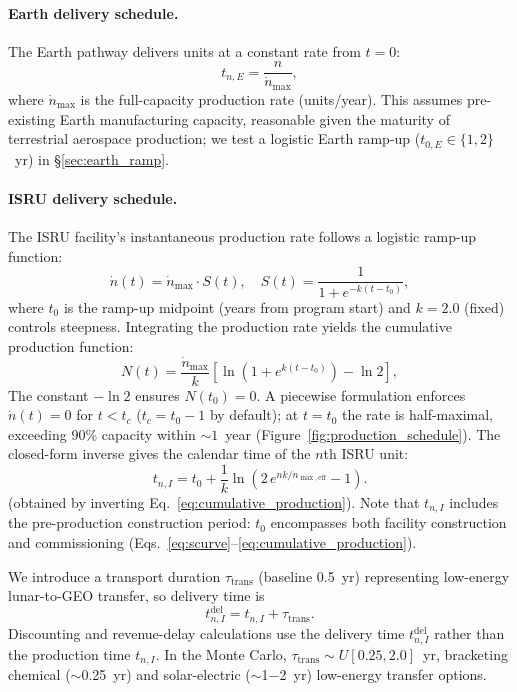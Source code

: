 \documentclass[preprint,12pt]{elsarticle}
\begin{document}
\paragraph{Earth delivery schedule.} The Earth pathway delivers units at a constant rate from $t = 0$:
\begin{equation}
  t_{n,E} = \frac{n}{\dot{n}_{\max}},
  \label{eq:earth_schedule}
\end{equation}
where $\dot{n}_{\max}$ is the full-capacity production rate (units/year). This assumes pre-existing Earth manufacturing capacity, reasonable given the maturity of terrestrial aerospace production; we test a logistic Earth ramp-up ($t_{0,E} \in \{1, 2\}$~yr) in \S\ref{sec:earth_ramp}.

\paragraph{ISRU delivery schedule.} The ISRU facility's instantaneous production rate follows a logistic ramp-up function:
\begin{equation}
  \dot{n}(t) = \dot{n}_{\max} \cdot S(t), \quad S(t) = \frac{1}{1 + e^{-k(t - t_0)}},
  \label{eq:scurve}
\end{equation}
where $t_0$ is the ramp-up midpoint (years from program start) and $k = 2.0$ (fixed) controls steepness. Integrating the production rate yields the cumulative production function:
\begin{equation}
  N(t) = \frac{\dot{n}_{\max}}{k} \left[ \ln\!\left(1 + e^{k(t - t_0)}\right) - \ln 2 \right],
  \label{eq:cumulative_production}
\end{equation}
The constant $-\ln 2$ ensures $N(t_0) = 0$. A piecewise formulation enforces $\dot{n}(t) = 0$ for $t < t_c$ ($t_c = t_0 - 1$ by default); at $t = t_0$ the rate is half-maximal, exceeding 90\% capacity within ${\sim}1$~year (Figure~\ref{fig:production_schedule}). The closed-form inverse gives the calendar time of the $n$th ISRU unit:
\begin{equation}
  t_{n,I} = t_0 + \frac{1}{k} \ln\!\left(2\,e^{nk/\dot{n}_{\max,\mathrm{eff}}} - 1\right).
  \label{eq:production_schedule}
\end{equation}
(obtained by inverting Eq.~\ref{eq:cumulative_production}). Note that $t_{n,I}$ includes the pre-production construction period: $t_0$ encompasses both facility construction and commissioning (Eqs.~\ref{eq:scurve}--\ref{eq:cumulative_production}).

We introduce a transport duration $\tau_{\mathrm{trans}}$ (baseline 0.5~yr) representing low-energy lunar-to-GEO transfer, so delivery time is
\begin{equation}
  t_{n,I}^{\mathrm{del}} = t_{n,I} + \tau_{\mathrm{trans}}.
  \label{eq:delivery_time}
\end{equation}
Discounting and revenue-delay calculations use the delivery time $t_{n,I}^{\mathrm{del}}$ rather than the production time $t_{n,I}$. In the Monte Carlo, $\tau_{\mathrm{trans}} \sim U[0.25, 2.0]$~yr, bracketing chemical ($\sim$0.25~yr) and solar-electric ($\sim$1$-$2~yr) low-energy transfer options.
\end{document}
